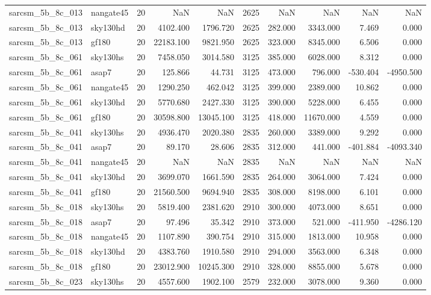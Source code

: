 \begin{longtable}{llrrrrrrrr}
sarcsm\_5b\_8c\_013 & nangate45 & 20 & NaN & NaN & 2625 & NaN & NaN & NaN & NaN \\
sarcsm\_5b\_8c\_013 & sky130hd & 20 & 4102.400 & 1796.720 & 2625 & 282.000 & 3343.000 & 7.469 & 0.000 \\
sarcsm\_5b\_8c\_013 & gf180 & 20 & 22183.100 & 9821.950 & 2625 & 323.000 & 8345.000 & 6.506 & 0.000 \\
sarcsm\_5b\_8c\_061 & sky130hs & 20 & 7458.050 & 3014.580 & 3125 & 385.000 & 6028.000 & 8.312 & 0.000 \\
sarcsm\_5b\_8c\_061 & asap7 & 20 & 125.866 & 44.731 & 3125 & 473.000 & 796.000 & -530.404 & -4950.500 \\
sarcsm\_5b\_8c\_061 & nangate45 & 20 & 1290.250 & 462.042 & 3125 & 399.000 & 2389.000 & 10.862 & 0.000 \\
sarcsm\_5b\_8c\_061 & sky130hd & 20 & 5770.680 & 2427.330 & 3125 & 390.000 & 5228.000 & 6.455 & 0.000 \\
sarcsm\_5b\_8c\_061 & gf180 & 20 & 30598.800 & 13045.100 & 3125 & 418.000 & 11670.000 & 4.559 & 0.000 \\
sarcsm\_5b\_8c\_041 & sky130hs & 20 & 4936.470 & 2020.380 & 2835 & 260.000 & 3389.000 & 9.292 & 0.000 \\
sarcsm\_5b\_8c\_041 & asap7 & 20 & 89.170 & 28.606 & 2835 & 312.000 & 441.000 & -401.884 & -4093.340 \\
sarcsm\_5b\_8c\_041 & nangate45 & 20 & NaN & NaN & 2835 & NaN & NaN & NaN & NaN \\
sarcsm\_5b\_8c\_041 & sky130hd & 20 & 3699.070 & 1661.590 & 2835 & 264.000 & 3064.000 & 7.424 & 0.000 \\
sarcsm\_5b\_8c\_041 & gf180 & 20 & 21560.500 & 9694.940 & 2835 & 308.000 & 8198.000 & 6.101 & 0.000 \\
sarcsm\_5b\_8c\_018 & sky130hs & 20 & 5819.400 & 2381.620 & 2910 & 300.000 & 4073.000 & 8.651 & 0.000 \\
sarcsm\_5b\_8c\_018 & asap7 & 20 & 97.496 & 35.342 & 2910 & 373.000 & 521.000 & -411.950 & -4286.120 \\
sarcsm\_5b\_8c\_018 & nangate45 & 20 & 1107.890 & 390.754 & 2910 & 315.000 & 1813.000 & 10.958 & 0.000 \\
sarcsm\_5b\_8c\_018 & sky130hd & 20 & 4383.760 & 1910.580 & 2910 & 294.000 & 3563.000 & 6.348 & 0.000 \\
sarcsm\_5b\_8c\_018 & gf180 & 20 & 23012.900 & 10245.300 & 2910 & 328.000 & 8855.000 & 5.678 & 0.000 \\
sarcsm\_5b\_8c\_023 & sky130hs & 20 & 4557.600 & 1902.100 & 2579 & 232.000 & 3078.000 & 9.360 & 0.000 \\

\end{longtable}
